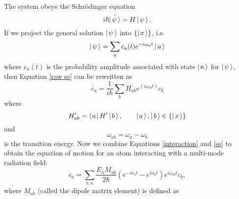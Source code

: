 The system obeys the Schr\"{o}dinger equation
\begin{equation}
i \hbar \dot{\ket{\psi}}
=
H \ket{\psi}.
\label{raw se}
\end{equation}
If we project the general solution $\left| \hspace{0.15em} \psi \hspace{0.15em}\right\rangle$ into $\{\left| \hspace{0.15em} x \hspace{0.15em}\right\rangle\}$, i.e.
\begin{equation}
\ket{\psi}
=
\sum_a
c_a(t) e^{-i \omega_a t}
\ket{a}
\label{expansion}
\end{equation}
where $c_a(t)$ is the probability amplitude associated with state $\left| \hspace{0.15em} a \hspace{0.15em}\right\rangle$ for $\left| \hspace{0.15em} \psi \hspace{0.15em}\right\rangle$, then Equation \ref{raw se} can be rewritten as \cite{Bransden:1989a}
\begin{equation}
\dot{c_a}
=
\frac{1}{i \hbar}
\sum_b
H^{\prime}_{ab}
e^{(i \omega_{ab} t)}
c_b
\label{se}
\end{equation}
where
\begin{equation}
H^{\prime}_{ab}
=
\left\langle \hspace{0.10em}a \hspace{0.10em}\right| H^{\prime} \left| \hspace{0.15em} b \hspace{0.15em}\right\rangle,
\qquad
\left| \hspace{0.15em} a \hspace{0.15em}\right\rangle,\left| \hspace{0.15em} b \hspace{0.15em}\right\rangle
\in
\{\left| \hspace{0.15em} x \hspace{0.15em}\right\rangle\}
\end{equation}
and
\begin{equation}
\omega_{ab}
=
\omega_a - \omega_b
\end{equation}
is the transition energy. Now we combine Equations \ref{interaction} and \ref{se} to obtain the equation of motion for an atom interacting with a multi-mode radiation field:
\begin{equation}
\boxed{
\dot{c_a}
=
\sum_{b,n}
\frac{E_n M_{ab}}{2 \hbar}
(
e^{-i \nu_n t}
-
e^{i \nu_n t}
)
e^{i \omega_{ab} t}
c_b,
\label{dim eom}
}
\end{equation}
where $M_{ab}$ (called the dipole matrix element) is defined as
